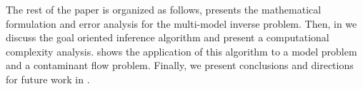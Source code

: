 


The rest of the paper is organized as follows,  presents the mathematical formulation and error analysis for the multi-model inverse problem. Then, in  we discuss the goal oriented inference algorithm and present a computational complexity analysis.  shows the application of this algorithm to a model problem and a contaminant flow problem. Finally, we present conclusions and directions for future work in .
